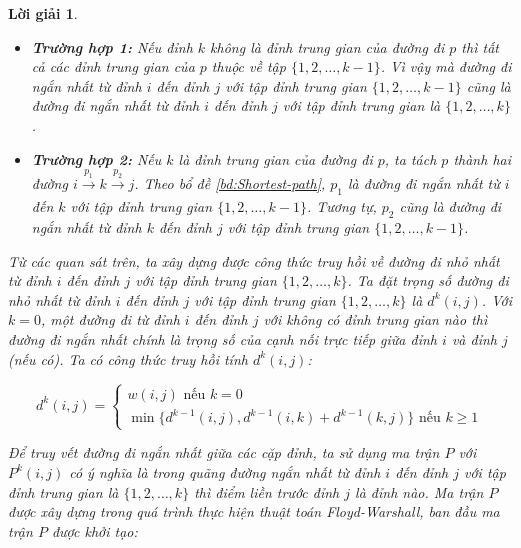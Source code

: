 \documentclass[14pt, a4paper]{article}
\theoremstyle{sltheorem}
\theoremstyle{soltheorem}
\newtheorem*{loigiai}{Lời giải}
\begin{document}
\begin{loigiai}
\begin{itemize}
\begin{itemize}
                \begin{itemize}
                    \item \textbf{Trường hợp 1:} Nếu đỉnh $k$ không là đỉnh trung gian của đường đi $p$ thì tất cả các đỉnh trung gian của $p$ thuộc về tập $\lbrace 1, 2, \dots, k-1 \rbrace$.
                    Vì vậy mà đường đi ngắn nhất từ đỉnh $i$ đến đỉnh $j$ với tập đỉnh trung gian $\lbrace 1, 2, \dots, k - 1 \rbrace$ cũng là đường đi ngắn nhất từ đỉnh $i$ đến đỉnh $j$ với tập đỉnh trung gian là $\lbrace 1, 2, \dots, k \rbrace$.
                    
                    \item \textbf{Trường hợp 2:} Nếu $k$ là đỉnh trung gian của đường đi $p$, ta tách $p$ thành hai đường $i \xrightarrow[]{p_1} k \xrightarrow[]{p_2} j$.
                    Theo bổ đề \ref{bd:Shortest-path}, $p_1$ là đường đi ngắn nhất từ $i$ đến $k$ với tập đỉnh trung gian $\lbrace 1, 2, \dots, k - 1 \rbrace$.
                    Tương tự, $p_2$ cũng là đường đi ngắn nhất từ đỉnh $k$ đến đỉnh $j$ với tập đỉnh trung gian $\lbrace 1, 2, \dots, k - 1 \rbrace$.
                \end{itemize}
                
                Từ các quan sát trên, ta xây dựng được công thức truy hồi về đường đi nhỏ nhất từ đỉnh $i$ đến đỉnh $j$ với tập đỉnh trung gian $\lbrace 1, 2, \dots, k \rbrace$.
                Ta đặt trọng số đường đi nhỏ nhất từ đỉnh $i$ đến đỉnh $j$ với tập đỉnh trung gian $\lbrace 1, 2, \dots, k \rbrace$ là $d^{k}(i, j)$. 
                Với $k = 0$, một đường đi từ đỉnh $i$ đến đỉnh $j$ với không có đỉnh trung gian nào thì đường đi ngắn nhất chính là trọng số của cạnh nối trực tiếp giữa đỉnh $i$ và đỉnh $j$ (nếu có).
                Ta có công thức truy hồi tính $d^k(i, j)$:

                \begin{equation*}
                    d^{k}(i, j) = \begin{cases} w(i, j) \text{ nếu } k = 0 \\ \min \big \lbrace d^{k-1}(i, j), d^{k-1}(i, k) + d^{k-1}(k, j)  \big\rbrace \text{ nếu } k \geq 1 \end{cases}
                \end{equation*}

                Để truy vết đường đi ngắn nhất giữa các cặp đỉnh, ta sử dụng ma trận $P$ với $P^{k}(i, j)$ có ý nghĩa là trong quãng đường ngắn nhất từ đỉnh $i$ đến đỉnh $j$ với tập đỉnh trung gian là $\lbrace 1, 2, \dots, k \rbrace$ thì điểm liền trước đỉnh $j$ là đỉnh nào.
                Ma trận $P$ được xây dựng trong quá trình thực hiện thuật toán Floyd-Warshall, ban đầu ma trận $P$ được khởi tạo:


\end{itemize}
\end{itemize}
\end{loigiai}
\end{document}
